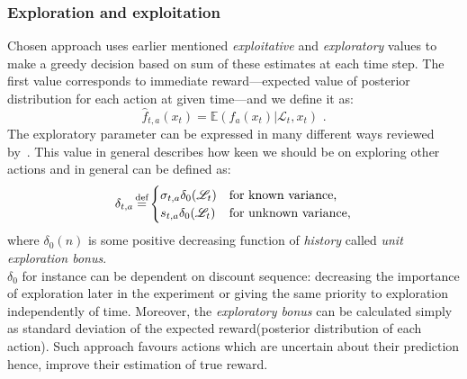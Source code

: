\documentclass[12pt, a4paper, pdflatex, leqno]{report}
\newcommand{\myeq}{\stackrel{\mathclap{\normalfont\scriptsize\mbox{def}}}{=}}
\begin{document}
\subsubsection{Exploration and exploitation}
Chosen approach uses earlier mentioned \emph{exploitative} and \emph{exploratory} values to make a greedy decision based on sum of these estimates at each time step. The first value corresponds to immediate reward---expected value of posterior distribution for each action at given time---and we define it as:
\begin{equation}
  \label{eqn:exploitative} \hat{f}_{t,a} (x_t) = \mathbb{E} ( f_a(x_t) | \mathscr{L}_t, x_t ) \text{ .}
\end{equation}
The exploratory parameter can be expressed in many different ways reviewed by~\citep{meuleau:exploration}. This value in general describes how keen we should be on exploring other actions and in general can be defined as:
$$
  \delta_{t,a} \myeq
    \begin{cases}
     \sigma_{t,a} \delta_0(\mathscr{L}_t) & \text{for known variance,}\\
     s_{t,a}      \delta_0(\mathscr{L}_t) & \text{for unknown variance,}
    \end{cases}
$$
where $\delta_0(n)$ is some positive decreasing function of \emph{history} called \emph{unit exploration bonus}.\\

$\delta_0$ for instance can be dependent on discount sequence: decreasing the importance of exploration later in the experiment or giving the same priority to exploration independently of time. Moreover, the \emph{exploratory bonus} can be calculated simply as standard deviation of the expected reward(posterior distribution of each action). Such approach favours actions which are uncertain about their prediction hence, improve their estimation of true reward.\\
\end{document}
